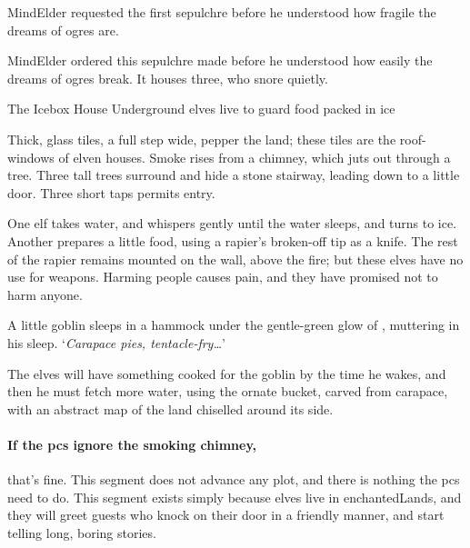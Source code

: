 \begin{exampletext}
  \Gls{MindElder} requested the first \gls{sepulchre} before he understood how fragile the dreams of \glspl{ogre} are.
\end{exampletext}
\Gls{MindElder} ordered this \gls{sepulchre} made before he understood how easily the dreams of \glspl{ogre} break.
It houses three, who snore quietly.

{The Icebox House}%
{Underground elves live to guard food packed in ice}%
\label{iceboxHouse}


Thick, glass tiles, a full step wide, pepper the land; these tiles are the roof-windows of elven houses.%
Smoke rises from a chimney, which juts out through a tree.
Three tall trees surround and hide a stone stairway, leading down to a little door.
Three short taps permits entry.

\begin{boxtext}
  One elf takes water, and whispers gently until the water sleeps, and turns to ice.
  Another prepares a little food, using a rapier's broken-off tip as a knife.
  The rest of the rapier remains mounted on the wall, above the fire; but these elves have no use for weapons.
  Harming people causes pain, and they have promised not to harm anyone.

  A little goblin sleeps in a hammock under the gentle-green glow of , muttering in his sleep.
  `\textit{Carapace pies, tentacle-fry\ldots}'
\end{boxtext}

The elves will have something cooked for the goblin by the time he wakes, and then he must fetch more water, using the ornate bucket, carved from carapace, with an abstract map of the land chiselled around its side.

\elf

\paragraph{If the \glspl{pc} ignore the smoking chimney,}
that's fine.
This \gls{segment} does not advance any plot, and there is nothing the \glspl{pc} need to do.
This \gls{segment} exists simply because elves live in \gls{enchantedLands}, and they will greet guests who knock on their door in a friendly manner, and start telling long, boring stories.

